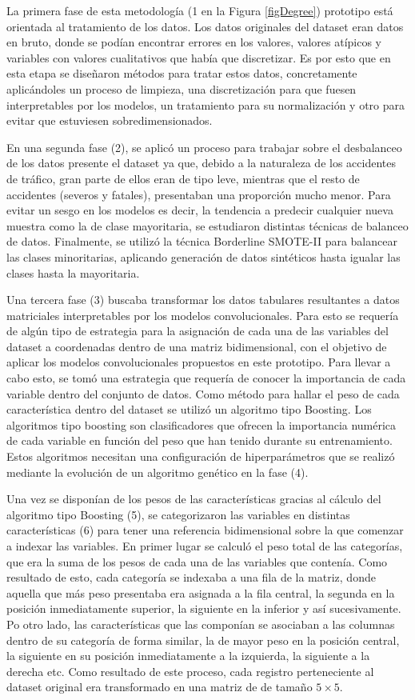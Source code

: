 \documentclass{uathesis-es}
\begin{document}
La primera fase de esta metodología (1 en la Figura \ref{figDegree}) prototipo está orientada al tratamiento de los datos. Los datos originales del dataset eran datos en bruto, donde se podían encontrar errores en los valores, valores atípicos y variables con valores cualitativos que había que discretizar. Es por esto que en esta etapa se diseñaron métodos para tratar estos datos, concretamente aplicándoles un proceso de limpieza, una discretización para que fuesen interpretables por los modelos, un tratamiento para su normalización y otro para evitar que estuviesen sobredimensionados.

En una segunda fase (2), se aplicó un proceso para trabajar sobre el desbalanceo de los datos presente el dataset ya que, debido a la naturaleza de los accidentes de tráfico, gran parte de ellos eran de tipo leve, mientras que el resto de accidentes (severos y fatales), presentaban una proporción mucho menor. Para evitar un sesgo en los modelos es decir, la tendencia a predecir cualquier nueva muestra como la de clase mayoritaria, se estudiaron distintas técnicas de balanceo de datos. Finalmente, se utilizó la técnica Borderline SMOTE-II para balancear las clases minoritarias, aplicando generación de datos sintéticos hasta igualar las clases hasta la mayoritaria.

Una tercera fase (3) buscaba transformar los datos tabulares resultantes a datos matriciales interpretables por los modelos convolucionales. Para esto se requería de algún tipo de estrategia para la asignación de cada una de las variables del dataset a coordenadas dentro de una matriz bidimensional, con el objetivo de aplicar los modelos convolucionales propuestos en este prototipo. Para llevar a cabo esto, se tomó una estrategia que requería de conocer la importancia de cada variable dentro del conjunto de datos. Como método para hallar el peso de cada característica dentro del dataset se utilizó un algoritmo tipo Boosting. Los algoritmos tipo boosting son clasificadores que ofrecen la importancia numérica de cada variable en función del peso que han tenido durante su entrenamiento. Estos algoritmos necesitan una configuración de hiperparámetros que se realizó mediante la evolución de un algoritmo genético en la fase (4).

Una vez se disponían de los pesos de las características gracias al cálculo del algoritmo tipo Boosting (5), se categorizaron las variables en distintas características (6) para tener una referencia bidimensional sobre la que comenzar a indexar las variables. En primer lugar se calculó el peso total de las categorías, que era la suma de los pesos de cada una de las variables que contenía. Como resultado de esto, cada categoría se indexaba a una fila de la matriz, donde aquella que más peso presentaba era asignada a la fila central, la segunda en la posición inmediatamente superior, la siguiente en la inferior y así sucesivamente. Po otro lado, las características que las componían se asociaban a las columnas dentro de su categoría de forma similar, la de mayor peso en la posición central, la siguiente en su posición inmediatamente a la izquierda, la siguiente a la derecha etc. Como resultado de este proceso, cada registro perteneciente al dataset original era transformado en una matriz de de tamaño $5\times5$.
\end{document}
